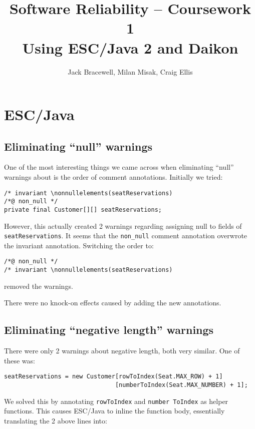 \documentclass[11pt]{article}
\title{Software Reliability -- Coursework 1 \\ Using ESC/Java 2 and Daikon}
\author{Jack Bracewell, Milan Misak, Craig Ellis}
\date{}
\begin{document}
\maketitle

\section{ESC/Java}

\subsection{Eliminating ``null'' warnings}

One of the most interesting things we came across when eliminating ``null'' warnings about is the order of comment annotations. Initially we tried:

\noindent
\begin{verbatim}
/* invariant \nonnullelements(seatReservations)
/*@ non_null */
private final Customer[][] seatReservations;
\end{verbatim}

However, this actually created 2 warnings regarding assigning null to fields of \verb|seatReservations|. It seems that the \verb|non_null| comment annotation overwrote the invariant annotation. Switching the order to:

\noindent
\begin{verbatim}
/*@ non_null */
/* invariant \nonnullelements(seatReservations)
\end{verbatim}

removed the warnings.

There were no knock-on effects caused by adding the new annotations.

\subsection{Eliminating ``negative length'' warnings}

There were only 2 warnings about negative length, both very similar. One of these was:

\noindent
\begin{verbatim}
seatReservations = new Customer[rowToIndex(Seat.MAX_ROW) + 1]
                               [numberToIndex(Seat.MAX_NUMBER) + 1];
\end{verbatim}

We solved this by annotating \verb|rowToIndex| and \verb|number ToIndex| as helper functions. This causes ESC/Java to inline the function body, essentially translating the 2 above lines into:
\end{document}

